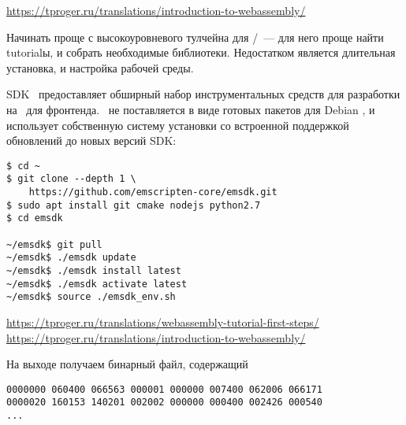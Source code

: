 \secdown

\noindent
\url{https://tproger.ru/translations/introduction-to-webassembly/}

\bigskip
Начинать проще с высокоуровневого тулчейна для \emc/\cpp\ --- для него проще
найти tutorialы, и собрать необходимые библиотеки. Недостатком является
длительная установка, и настройка рабочей среды. 


\noindent
SDK \ems\ предоставляет обширный набор инструментальных средств для разработки
на \cpp\ для фронтенда. \ems\ не поставляется в виде готовых пакетов для Debian
\linux, и использует собственную систему установки со встроенной поддержкой
обновлений до новых версий SDK:
\begin{lstlisting}
$ cd ~
$ git clone --depth 1 \
	https://github.com/emscripten-core/emsdk.git
$ sudo apt install git cmake nodejs python2.7
$ cd emsdk

~/emsdk$ git pull
~/emsdk$ ./emsdk update
~/emsdk$ ./emsdk install latest
~/emsdk$ ./emsdk activate latest
~/emsdk$ source ./emsdk_env.sh
\end{lstlisting}


\noindent
\url{https://tproger.ru/translations/webassembly-tutorial-first-steps/}\\
\url{https://tproger.ru/translations/introduction-to-webassembly/}

\bigskip
{}

\bigskip
{}
На выходе получаем бинарный файл, содержащий 
\begin{lstlisting}[title=none.wasm]
0000000 060400 066563 000001 000000 007400 062006 066171
0000020 160153 140201 002002 000000 000400 002426 000540
...
\end{lstlisting}


